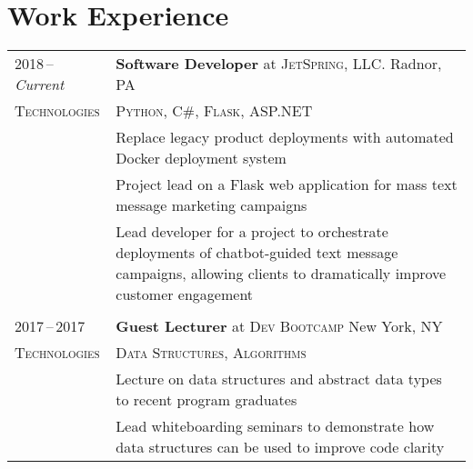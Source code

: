 \documentclass[a4paper,11pt]{article}
\begin{document}
\section{Work Experience}
\begin{tabularx}{\textwidth}{@{\extracolsep{2pt}}p{6em}|X@{}}
    2018\,--\,\emph{Current} & \textbf{Software Developer} at \textsc{JetSpring, LLC.} \hfill Radnor, PA \\
    \textsc{Technologies}    & \textsc{Python}, \textsc{C\#}, \textsc{Flask}, \textsc{ASP.NET} \\
                             & \footnotesize Replace legacy product deployments with automated Docker deployment system \\
                             & \footnotesize Project lead on a Flask web application for mass text message marketing campaigns \\
                             & \footnotesize Lead developer for a project to orchestrate deployments of chatbot-guided text message campaigns, allowing clients to dramatically improve customer engagement \\
    \multicolumn{2}{c}{} \\

    2017\,--\,2017           & \textbf{Guest Lecturer} at \textsc{Dev Bootcamp} \hfill New York, NY \\
    \textsc{Technologies}    & \textsc{Data Structures}, \textsc{Algorithms} \\
                             & \footnotesize Lecture on data structures and abstract data types to recent program graduates \\
                             & \footnotesize Lead whiteboarding seminars to demonstrate how data structures can be used to improve code clarity \\
\end{tabularx}
\end{document}
